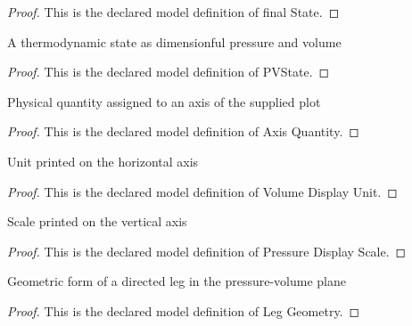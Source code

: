 \begin{proof}
  This is the declared model definition of final State.
\end{proof}
\begin{definition}[PVState]
  \label{def:physics:phyx-mini-0338:phyxminiproblems-problemphyxmini0338-pvstate}
  A thermodynamic state as dimensionful pressure and volume
\end{definition}
\begin{proof}
  This is the declared model definition of PVState.
\end{proof}
\begin{definition}
  \label{def:physics:phyx-mini-0338:phyxminiproblems-problemphyxmini0338-axisquantity}
  Physical quantity assigned to an axis of the supplied plot
\end{definition}
\begin{proof}
  This is the declared model definition of Axis Quantity.
\end{proof}
\begin{definition}
  \label{def:physics:phyx-mini-0338:phyxminiproblems-problemphyxmini0338-volumedisplayunit}
  Unit printed on the horizontal axis
\end{definition}
\begin{proof}
  This is the declared model definition of Volume Display Unit.
\end{proof}
\begin{definition}
  \label{def:physics:phyx-mini-0338:phyxminiproblems-problemphyxmini0338-pressuredisplayscale}
  Scale printed on the vertical axis
\end{definition}
\begin{proof}
  This is the declared model definition of Pressure Display Scale.
\end{proof}
\begin{definition}
  \label{def:physics:phyx-mini-0338:phyxminiproblems-problemphyxmini0338-leggeometry}
  Geometric form of a directed leg in the pressure-volume plane
\end{definition}
\begin{proof}
  This is the declared model definition of Leg Geometry.
\end{proof}

